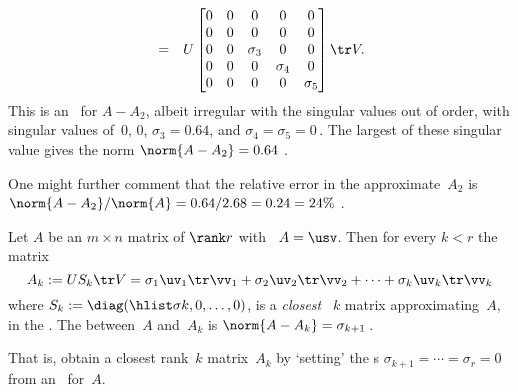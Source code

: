 \begin{example}
\begin{solution}
\begin{itemize}
\begin{eqnarray*}
\\&=&U\begin{bmatrix} 0&0&0&0&0
\\0&0&0&0&0
\\0&0&\sigma_3&0&0
\\0&0&0&\sigma_4&0
\\0&0&0&0&\sigma_5 \end{bmatrix}\tr V.
\end{eqnarray*}
This is an \svd\ for \(A-A_2\), albeit irregular with the singular values out of order, with singular values of~\(0\), \(0\), \(\sigma_3=0.64\), and \(\sigma_4=\sigma_5=0\)\,.
The largest of these singular value gives the norm \(\norm{A-A_2}=0.64\) \twodp.

One might further comment that the relative error in the approximate~\(A_2\) is \(\norm{A-A_2}/\norm{A}=0.64/2.68=0.24=24\%\) \twodp.
\end{itemize}
\end{solution}
\end{example}








\begin{theorem} \label{thm:am}
Let \(A\) be an \(m\times n\) matrix of \(\rank r\) with \svd\ \(A=\usv\).  
Then for every \(k< r\) the matrix
\begin{equation}
A_k:=US_k\tr V =\sigma_1\uv_1\tr\vv_1 +\sigma_2\uv_2\tr\vv_2+\cdots +\sigma_k\uv_k\tr\vv_k
\label{eq:rankkA}
\end{equation}
where \(S_k:=\diag(\hlist\sigma k,0,\ldots,0)\), is a \emph{closest} ~\(k\) matrix approximating~\(A\), in the .
The  between~\(A\) and~\(A_k\) is \(\norm{A-A_k}=\sigma_{k+1}\)\,.
\end{theorem}

That is, obtain a closest rank~\(k\) matrix~\(A_k\) by `setting' the s \(\sigma_{k+1}=\cdots=\sigma_r=0\) from an \svd\ for~\(A\).

